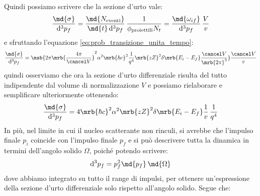 Quindi possiamo scrivere che la sezione d'urto vale:
\begin{equation}
  \frac{\md{\sigma}}{\mathrm{d}^3p_f} = \frac{\md{N_\text{eventi}}}{\md{t} \,
  \mathrm{d}^3p_f} \, \frac{1}{\phi_\text{proiettili} N_t} =
  \frac{\md{\omega_{if}}}{\mathrm{d}^3p_f} \, \frac{V}{v}
\end{equation}
e sfruttando l'equazione \ref{eq:prob_transizione_unita_tempo}:
\begin{equation}
  \frac{\md{\sigma}}{\mathrm{d}^3p_f} = \msb{2\pi \mrb{\frac{4\pi}{\cancel
  V}}^2 \alpha^2 \mrb{\hbar c}^2 \frac{1}{q^4} \mrb{zZ}^2 \delta\mrb{E_i -
  E_f} \frac{\cancel V}{\mrb{2\pi}^3}} \frac{\cancel V}{v}
\end{equation}
quindi osserviamo che ora la sezione d'urto differenziale risulta del tutto
indipendente dal volume di normalizzazione $V$ e possiamo rielaborare e
semplificare ulteriormente ottenendo:
\begin{equation}
  \frac{\md{\sigma}}{\mathrm{d}^3p_f} = 4 \mrb{\hbar c}^2 \alpha^2 \mrb{zZ}^2
  \delta\mrb{E_i - E_f} \frac{1}{v} \, \frac{1}{q^4}
\end{equation}
In più, nel limite in cui il nucleo scatterante non rinculi, si avrebbe che
l'impulso finale $p_i$ coincide con l'impulso finale $p_f$ e si può descrivere
tutta la dinamica in termini dell'angolo solido $\Omega$, poiché potendo
scrivere:
\begin{equation}
  \mathrm{d}^3p_f = p_f^2 \md{p_f} \, \md{\Omega }
\end{equation}
dove abbiamo integrato su tutto il range di impulsi, per ottenere
un'espressione della sezione d'urto differenziale solo rispetto all'angolo
solido. Segue che:
